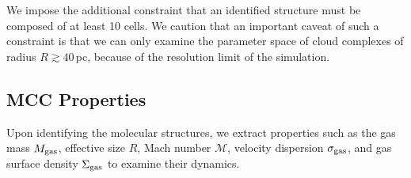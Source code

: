 \IfFileExists{emulateapjlegacy.cls}{\documentclass[iop]{emulateapjlegacy}}{\documentclass[iop]{emulateapj}}
\begin{document}
We impose the additional constraint that an identified structure must be composed of at least 10 cells. We caution that an important caveat of such a constraint is that we can only examine the parameter space of cloud complexes of radius $R\gtrsim 40$\,pc, because of the resolution limit of the simulation.

\subsection{MCC Properties} \label{sec:distribution}

Upon identifying the molecular structures, we extract properties such as the gas mass $M_{\rm gas}$, effective size $R$, Mach number
$\mathcal{M}$, velocity dispersion $\sigma_{\rm gas}$, and gas surface density $\Sigma_{\rm gas}$ to examine their dynamics.
\end{document}
